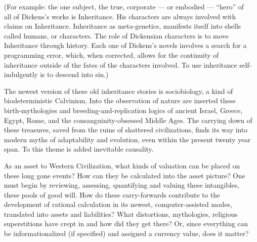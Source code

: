 (For example: the one subject, the true, corporate --- or embodied --- \enquote{hero} of all of Dickens's works is Inheritance. His characters are always involved with claims on Inheritance. Inheritance as meta-genetics, manifests itself into shells called humans, or characters. The role of Dickensian characters is to move Inheritance through history. Each one of Dickens's novels involves a search for a programming error, which, when corrected, allows for the continuity of inheritance outside of the fates of the characters involved. To use inheritance self-indulgently is to descend into sin.)

The newest version of these old inheritance stories is sociobiology, a kind of biodeterministic Calvinism. Into the observation of nature are inserted these birth-mythologies and breeding-and-replication logics of ancient Israel, Greece, Egypt, Rome, and the consanguinity-obsessed Middle Ages. The carrying down of these treasures, saved from the ruins of shattered civilizations, finds its way into modern myths of adaptability and evolution, even within the present twenty year span. To this theme is added inevitable causality.

As an asset to Western Civilization, what kinds of valuation can be placed on these long gone events? How can they be calculated into the asset picture? One must begin by reviewing, assessing, quantifying and valuing these intangibles, these pools of good will. How do these carry-forwards contribute to the development of rational calculation in its newest, computer-assisted modes, translated into assets and liabilities? What distortions, mythologies, religious superstitions have crept in and how did they get there? Or, since everything can be informationalized (if specified) and assigned a currency value, does it matter?
